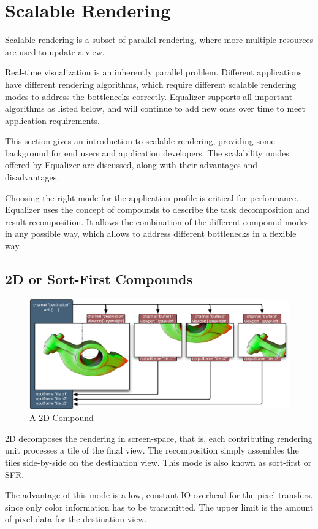 \documentclass[10pt,a4]{scrartcl}
\begin{document}
\section{Scalable Rendering}

Scalable rendering is a subset of parallel rendering, where more multiple
resources are used to update a view.

Real-time visualization is an inherently parallel problem. Different
applications have different rendering algorithms, which require different
scalable rendering modes to address the bottlenecks correctly. Equalizer
supports all important algorithms as listed below, and will continue to add new
ones over time to meet application requirements.

This section gives an introduction to scalable rendering, providing some
background for end users and application developers. The scalability
modes offered by Equalizer are discussed, along with their advantages
and disadvantages.

Choosing the right mode for the application profile is critical for
performance. Equalizer uses the concept of compounds to describe the
task decomposition and result recomposition. It allows the combination
of the different compound modes in any possible way, which allows to
address different bottlenecks in a flexible way.


\subsection{2D or Sort-First Compounds}

\begin{figure}
  \includegraphics[width=.618\textwidth]{images/2D.pdf}
  {\caption{A 2D Compound}}
\end{figure}
2D decomposes the rendering in screen-space, that is, each contributing
rendering unit processes a tile of the final view. The recomposition
simply assembles the tiles side-by-side on the destination view. This
mode is also known as sort-first or SFR.

The advantage of this mode is a low, constant IO overhead for the pixel
transfers, since only color information has to be transmitted. The upper
limit is the amount of pixel data for the destination view.
\end{document}
